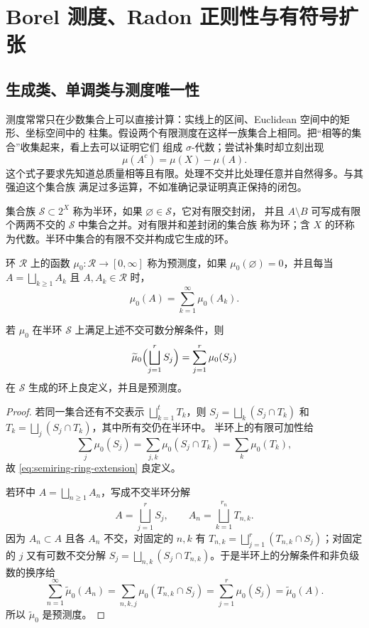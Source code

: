 \section{Borel 测度、Radon 正则性与有符号扩张}\label{sec:02-02}

\subsection{生成类、单调类与测度唯一性}\label{subsec:2-2-1}

测度常常只在少数集合上可以直接计算：实线上的区间、Euclidean 空间中的矩形、坐标空间中的
柱集。假设两个有限测度在这样一族集合上相同。把“相等的集合”收集起来，看上去可以证明它们
组成 $\sigma$-代数；尝试补集时却立刻出现
\[
 \mu(A^c)=\mu(X)-\mu(A).
\]
这个式子要求先知道总质量相等且有限。处理不交并比处理任意并自然得多。与其强迫这个集合族
满足过多运算，不如准确记录证明真正保持的闭包。

\begin{definition}[半环、环与代数]\label{def:2-2-1-0a}
集合族 $\mathcal S\subset2^X$ 称为半环，如果 $\varnothing\in\mathcal S$，它对有限交封闭，
并且 $A\setminus B$ 可写成有限个两两不交的 $\mathcal S$ 中集合之并。对有限并和差封闭的集合族
称为环；含 $X$ 的环称为代数。半环中集合的有限不交并构成它生成的环。
\end{definition}

\begin{definition}[预测度]\label{def:2-2-1-0b}
环 $\mathcal R$ 上的函数 $\mu_0:\mathcal R\to[0,\infty]$ 称为预测度，如果
$\mu_0(\varnothing)=0$，并且每当 $A=\bigsqcup_{k\ge1}A_k$ 且
$A,A_k\in\mathcal R$ 时，
\[
 \mu_0(A)=\sum_{k=1}^{\infty}\mu_0(A_k).
\]
\end{definition}

\begin{lemma}[半环数据延拓到环]\label{lem:premeasure-semiring-to-ring}
若 $\mu_0$ 在半环 $\mathcal S$ 上满足上述不交可数分解条件，则
\[
 \widetilde\mu_0\Bigl(\bigsqcup_{j=1}^rS_j\Bigr)=\sum_{j=1}^r\mu_0(S_j)
 \label{eq:semiring-ring-extension}
\]
在 $\mathcal S$ 生成的环上良定义，并且是预测度。
\end{lemma}

\begin{proof}
若同一集合还有不交表示 $\bigsqcup_{k=1}^tT_k$，则
$S_j=\bigsqcup_k(S_j\cap T_k)$ 和 $T_k=\bigsqcup_j(S_j\cap T_k)$，其中所有交仍在半环中。
半环上的有限可加性给
\[
 \sum_j\mu_0(S_j)=\sum_{j,k}\mu_0(S_j\cap T_k)=\sum_k\mu_0(T_k),
\]
故 \eqref{eq:semiring-ring-extension} 良定义。

若环中 $A=\bigsqcup_{n\ge1}A_n$，写成不交半环分解
\[
 A=\bigsqcup_{j=1}^rS_j,
 \qquad A_n=\bigsqcup_{k=1}^{r_n}T_{n,k}.
\]
因为 $A_n\subset A$ 且各 $A_n$ 不交，对固定的 $n,k$ 有
$T_{n,k}=\bigsqcup_{j=1}^r(T_{n,k}\cap S_j)$；对固定的 $j$ 又有可数不交分解
$S_j=\bigsqcup_{n,k}(S_j\cap T_{n,k})$。于是半环上的分解条件和非负级数的换序给
\[
 \sum_{n=1}^{\infty}\widetilde\mu_0(A_n)
 =\sum_{n,k,j}\mu_0(T_{n,k}\cap S_j)
 =\sum_{j=1}^r\mu_0(S_j)
 =\widetilde\mu_0(A).
\]
所以 $\widetilde\mu_0$ 是预测度。
\end{proof}


